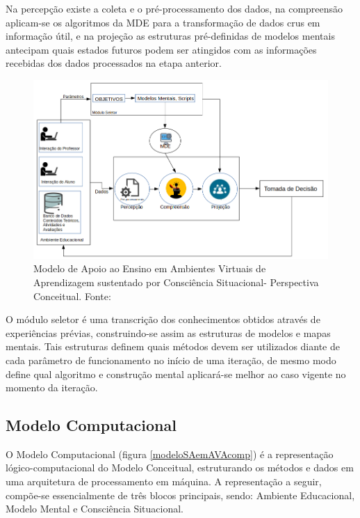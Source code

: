 \documentclass[
	oneside,
	12pt,				%
	a4paper,			%
	english,			%
	brazil,				%
	article
	]{abntex2}
\begin{document}
{Na percepção existe a coleta e o pré-processamento dos dados, na compreensão aplicam-se os algoritmos da MDE para a transformação de dados crus em informação útil, e na projeção as estruturas pré-definidas de modelos mentais antecipam quais estados futuros podem ser atingidos com as informações recebidas dos dados processados na etapa anterior.

\begin{figure}[H]	
	\centering
	\includegraphics[scale=0.57]{teste_modelov02}
	\caption{Modelo de Apoio ao Ensino em Ambientes Virtuais de Aprendizagem sustentado por Consciência Situacional- Perspectiva Conceitual. Fonte: \cite{Martins2018} }
	\label{modeloSAemAVA}	
\end{figure}

\newpage

O módulo seletor é uma transcrição dos conhecimentos obtidos através de experiências prévias, construindo-se assim as estruturas de modelos e mapas mentais. Tais estruturas definem quais métodos devem ser utilizados diante de cada parâmetro de funcionamento no início de uma iteração, de mesmo modo define qual algoritmo e construção mental aplicará-se melhor ao caso vigente no momento da iteração.

\subsection{Modelo Computacional}

O Modelo Computacional (figura \ref{modeloSAemAVAcomp}) é a representação lógico-computacional do Modelo Conceitual, estruturando os métodos e dados em uma arquitetura de processamento em máquina. A representação a seguir, compõe-se essencialmente de três blocos principais, sendo: Ambiente Educacional, Modelo Mental e Consciência Situacional.

}
\end{document}
